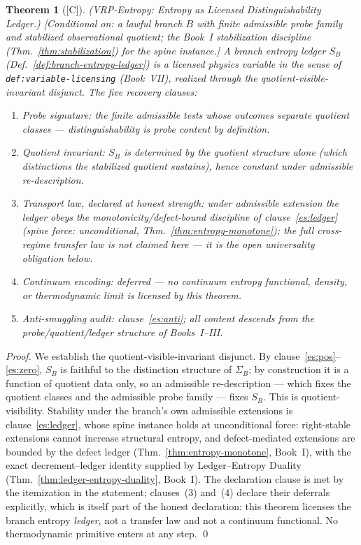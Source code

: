 \documentclass[12pt,oneside]{amsbook}
\theoremstyle{plain}
\newtheorem{theorem}{Theorem}[section]
\theoremstyle{definition}
\theoremstyle{remark}
\newcommand{\status}[1]{\textup{[#1]}}
\begin{document}
\begin{theorem}[\status{C}]\label{thm:vrp-entropy}
\textup{(VRP-Entropy: Entropy as Licensed Distinguishability
Ledger.)}
\textup{[Conditional on: a lawful branch $B$ with finite
admissible probe family and stabilized observational quotient;
the Book~I stabilization discipline
(Thm.~\ref{thm:stabilization}) for the spine instance.]}
A branch entropy ledger $S_B$
(Def.~\ref{def:branch-entropy-ledger}) is a licensed physics
variable in the sense of \texttt{def:variable-licensing}
(Book~VII), realized through the quotient-visible-invariant
disjunct.  The five recovery clauses:
\begin{enumerate}[label=\textup{(\arabic*)}]
  \item \emph{Probe signature:} the finite admissible tests whose
    outcomes separate quotient classes --- distinguishability is
    probe content by definition.
  \item \emph{Quotient invariant:} $S_B$ is determined by the
    quotient structure alone (which distinctions the stabilized
    quotient sustains), hence constant under admissible
    re-description.
  \item \emph{Transport law, declared at honest strength:}
    under admissible extension the ledger obeys the
    monotonicity/defect-bound discipline of
    clause~\ref{es:ledger} (spine force: unconditional,
    Thm.~\ref{thm:entropy-monotone}); the full cross-regime
    transfer law is \emph{not} claimed here --- it is the open
    universality obligation below.
  \item \emph{Continuum encoding:} deferred --- no continuum
    entropy functional, density, or thermodynamic limit is
    licensed by this theorem.
  \item \emph{Anti-smuggling audit:} clause~\ref{es:anti}; all
    content descends from the probe/quotient/ledger structure of
    Books~I--III.
\end{enumerate}
\end{theorem}

\begin{proof}
We establish the quotient-visible-invariant disjunct.  By
clause~\ref{es:pos}--\ref{es:zero}, $S_B$ is faithful to the
distinction structure of $\Sigma_B$; by construction it is a
function of quotient data only, so an admissible re-description
--- which fixes the quotient classes and the admissible probe
family --- fixes $S_B$.  This is quotient-visibility.  Stability
under the branch's own admissible extensions is
clause~\ref{es:ledger}, whose spine instance holds at
unconditional force: right-stable extensions cannot increase
structural entropy, and defect-mediated extensions are bounded by
the defect ledger (Thm.~\ref{thm:entropy-monotone}, Book~I), with
the exact decrement--ledger identity supplied by Ledger--Entropy
Duality (Thm.~\ref{thm:ledger-entropy-duality}, Book~I).  The
declaration clause is met by the itemization in the statement;
clauses~(3) and~(4) declare their deferrals explicitly, which is
itself part of the honest declaration: this theorem licenses the
branch entropy \emph{ledger}, not a transfer law and not a
continuum functional.  No thermodynamic primitive enters at any
step. \qed
\end{proof}
\end{document}
